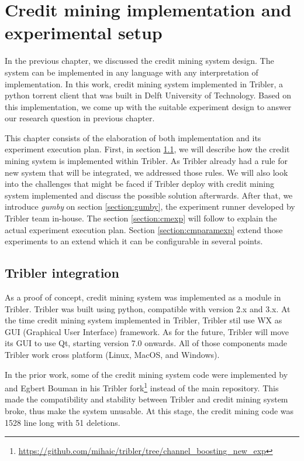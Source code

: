 \chapter{Credit mining implementation and experimental setup}
\label{chp:implexperiment}
In the previous chapter, we discussed the credit mining system design. The system can be implemented in any language with any interpretation of implementation. In this work, credit mining system implemented in Tribler, a python torrent client that was built in Delft University of Technology. Based on this implementation, we come up with the suitable experiment design to answer our research question in previous chapter. 

This chapter consists of the elaboration of both implementation and its experiment execution plan. First, in section \ref{section:triblerintregration}, we will describe how the credit mining system is implemented within Tribler. As Tribler already had a rule for new system that will be integrated, we addressed those rules. We will also look into the challenges that might be faced if Tribler deploy with credit mining system implemented and discuss the possible solution afterwards. After that, we introduce \textit{gumby} on section \ref{section:gumby}, the experiment runner developed by Tribler team in-house. The section \ref{section:cmexp} will follow to explain the actual experiment execution plan. Section \ref{section:cmparamexp} extend those experiments to an extend which it can be configurable in several points.

\section{Tribler integration}
\label{section:triblerintregration}
As a proof of concept, credit mining system was implemented as a module in Tribler. Tribler was built using python, compatible with version 2.x and 3.x. At the time credit mining system implemented in Tribler, Tribler stil use WX as GUI (Graphical User Interface) framework. As for the future, Tribler will move its GUI to use Qt, starting version 7.0 onwards. All of those components made Tribler work cross platform (Linux, MacOS, and Windows).

In the prior work, some of the credit mining system code were implemented by \citeauthor{2015:creditmining:capota} and Egbert Bouman in his Tribler fork\footnote{\url{https://github.com/mihaic/tribler/tree/channel_boosting_new_exp}} instead of the main repository. This made the compatibility and stability between Tribler and credit mining system broke, thus make the system unusable. At this stage, the credit mining code was 1528 line long with 51 deletions.

